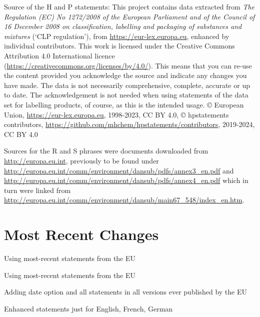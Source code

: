 \documentclass[a4paper,notitlepage,parskip=half]{scrreprt}
\newenvironment{annotation}{\bgroup\footnotesize}{\par\egroup}
\begin{document}
\begin{annotation}\RaggedRight\sloppypar Source of the H and P statements:
This project contains data extracted from
\emph{The Regulation (EC) No 1272/2008 of the European Parliament and of the Council of 16 December 2008 on classification, labelling and packaging of substances and mixtures}
(`CLP regulation'),
from \url{https://eur-lex.europa.eu},
enhanced by individual contributors.
This work is licensed under the
Creative Commons Attribution 4.0 International licence
(\url{https://creativecommons.org/licenses/by/4.0/}).
This means that you can re-use the content provided you acknowledge the source and indicate any changes you have made.
The data is not necessarily comprehensive, complete, accurate or up to date.
The acknowledgement is not needed when using statements of the data set for labelling products, of course, as this is the intended usage.
© European Union, \url{https://eur-lex.europa.eu}, 1998-2023, CC BY 4.0,
© hpstatements contributors, \url{https://github.com/mhchem/hpstatements/contributors}, 2019-2024, CC BY 4.0

Sources for the R and S phrases were documents downloaded from
\url{http://europa.eu.int}, previously to be found under
\url{http://europa.eu.int/comm/environment/dansub/pdfs/annex3_en.pdf} and
\url{http://europa.eu.int/comm/environment/dansub/pdfs/annex4_en.pdf}
which in turn were linked from
\url{http://europa.eu.int/comm/environment/dansub/main67_548/index_en.htm}.
\end{annotation}


\section{Most Recent Changes}%

\begin{compactitem}
  \item Using most-recent statements from the EU
\end{compactitem}

\begin{compactitem}
  \item Using most-recent statements from the EU
  \item Adding date option and all statements in all versions ever published by the EU
  \item Enhanced statements just for English, French, German
\end{compactitem}
\end{document}
